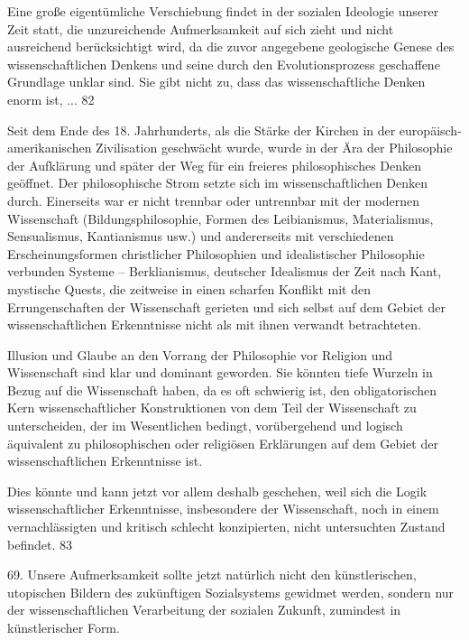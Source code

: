 \documentclass[11pt,a4paper]{book}
\begin{document}
Eine große eigentümliche Verschiebung findet in der sozialen Ideologie unserer Zeit statt, die unzureichende Aufmerksamkeit auf sich zieht und nicht ausreichend berücksichtigt wird, da die zuvor angegebene geologische Genese des wissenschaftlichen Denkens und seine durch den Evolutionsprozess geschaffene Grundlage unklar sind. Sie gibt nicht zu, dass das wissenschaftliche Denken enorm ist, ... 82



Seit dem Ende des 18. Jahrhunderts, als die Stärke der Kirchen in der europäisch-amerikanischen Zivilisation geschwächt wurde, wurde in der Ära der Philosophie der Aufklärung und später der Weg für ein freieres philosophisches Denken geöffnet. Der philosophische Strom setzte sich im wissenschaftlichen Denken durch. Einerseits war er nicht trennbar oder untrennbar mit der modernen Wissenschaft (Bildungsphilosophie, Formen des Leibianismus, Materialismus, Sensualismus, Kantianismus usw.) und andererseits mit verschiedenen Erscheinungsformen christlicher Philosophien und idealistischer Philosophie verbunden Systeme -- Berklianismus, deutscher Idealismus der Zeit nach Kant, mystische Quests, die zeitweise in einen scharfen Konflikt mit den Errungenschaften der Wissenschaft gerieten und sich selbst auf dem Gebiet der wissenschaftlichen Erkenntnisse nicht als mit ihnen verwandt betrachteten.



Illusion und Glaube an den Vorrang der Philosophie vor Religion und Wissenschaft sind klar und dominant geworden. Sie könnten tiefe Wurzeln in Bezug auf die Wissenschaft haben, da es oft schwierig ist, den obligatorischen Kern wissenschaftlicher Konstruktionen von dem Teil der Wissenschaft zu unterscheiden, der im Wesentlichen bedingt, vorübergehend und logisch äquivalent zu philosophischen oder religiösen Erklärungen auf dem Gebiet der wissenschaftlichen Erkenntnisse ist.



Dies könnte und kann jetzt vor allem deshalb geschehen, weil sich die Logik wissenschaftlicher Erkenntnisse, insbesondere der Wissenschaft, noch in einem vernachlässigten und kritisch schlecht konzipierten, nicht untersuchten Zustand befindet. 83



69. Unsere Aufmerksamkeit sollte jetzt natürlich nicht den künstlerischen, utopischen Bildern des zukünftigen Sozialsystems gewidmet werden, sondern nur der wissenschaftlichen Verarbeitung der sozialen Zukunft, zumindest in künstlerischer Form.
\end{document}
